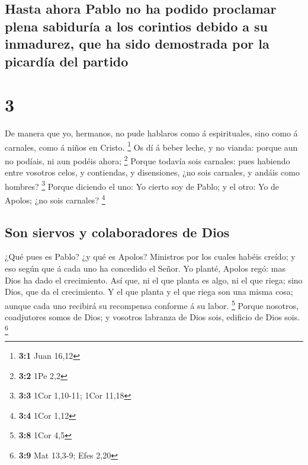 \hypertarget{hasta-ahora-pablo-no-ha-podido-proclamar-plena-sabiduruxeda-a-los-corintios-debido-a-su-inmadurez-que-ha-sido-demostrada-por-la-picarduxeda-del-partido}{%
\subsection{Hasta ahora Pablo no ha podido proclamar plena sabiduría a
los corintios debido a su inmadurez, que ha sido demostrada por la
picardía del
partido}\label{hasta-ahora-pablo-no-ha-podido-proclamar-plena-sabiduruxeda-a-los-corintios-debido-a-su-inmadurez-que-ha-sido-demostrada-por-la-picarduxeda-del-partido}}

\hypertarget{section-2}{%
\section{3}\label{section-2}}

 De manera que yo, hermanos, no pude hablaros como á
espirituales, sino como á carnales, como á niños en Cristo. \footnote{\textbf{3:1}
  Juan 16,12}  Os dí á beber leche, y no vianda: porque
aun no podíais, ni aun podéis ahora; \footnote{\textbf{3:2} 1Pe 2,2}
 Porque todavía sois carnales: pues habiendo entre
vosotros celos, y contiendas, y disensiones, ¿no sois carnales, y andáis
como hombres? \footnote{\textbf{3:3} 1Cor 1,10-11; 1Cor 11,18}
 Porque diciendo el uno: Yo cierto soy de Pablo; y el
otro: Yo de Apolos; ¿no sois carnales? \footnote{\textbf{3:4} 1Cor 1,12}

\hypertarget{son-siervos-y-colaboradores-de-dios}{%
\subsection{Son siervos y colaboradores de
Dios}\label{son-siervos-y-colaboradores-de-dios}}

 ¿Qué pues es Pablo? ¿y qué es Apolos? Ministros por los
cuales habéis creído; y eso según que á cada uno ha concedido el Señor.
 Yo planté, Apolos regó: mas Dios ha dado el crecimiento.
 Así que, ni el que planta es algo, ni el que riega; sino
Dios, que da el crecimiento.  Y el que planta y el que
riega son una misma cosa; aunque cada uno recibirá su recompensa
conforme á su labor. \footnote{\textbf{3:8} 1Cor 4,5} 
Porque nosotros, coadjutores somos de Dios; y vosotros labranza de Dios
sois, edificio de Dios sois. \footnote{\textbf{3:9} Mat 13,3-9; Efes
  2,20}

